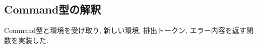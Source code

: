 \documentclass[uplatex,a4j]{jsreport}
\begin{document}
\subsection{Command型の解釈}
Command型と環境を受け取り, 新しい環境, 排出トークン, エラー内容を返す関数を実装した.








\end{document}
